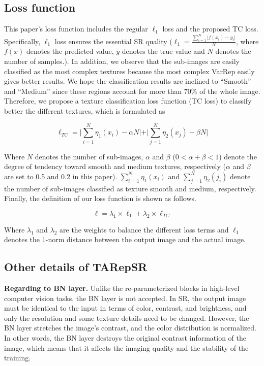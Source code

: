 \documentclass[sn-mathphys]{sn-jnl}%
\theoremstyle{thmstyleone}%
\theoremstyle{thmstyletwo}%
\theoremstyle{thmstylethree}%
\begin{document}
\subsection{Loss function}
This paper's loss function includes the regular $\ell_1$ loss and the proposed TC loss. Specifically, $\ell_1$ loss ensures the essential SR quality ($\ell_1=\frac{\sum_{i=1}^N \rvert f\left(x_i\right)-y_i \rvert}{N}$, where $f\left(x\right)$ denotes the predicted value, $y$ denotes the true value and $N$ denotes the number of samples.). In addition, we observe that the sub-images are easily classified as the most complex textures because the most complex VarRep easily gives better results. We hope the classification results are inclined to ``Smooth'' and ``Medium'' since these regions account for more than 70\% of the whole image. Therefore, we propose a texture classification loss function (TC loss) to classify better the different textures, which is formulated as

\begin{equation}
\ell_{T C}=\rvert \sum_{i=1}^N \eta_1\left(x_i\right)-\alpha N \rvert+\rvert \sum_{j=1}^N \eta_2\left(x_j\right)-\beta N \rvert
\end{equation} 

Where $N$ denotes the number of sub-images, $\alpha$ and $\beta$ ($0<\alpha+\beta<1$) denote the degree of tendency toward smooth and medium textures, respectively ($\alpha$ and $\beta$ are set to 0.5 and 0.2 in this paper).
$\sum_{i=1}^N \eta_1\left(x_i\right)$ and $\sum_{j=1}^N \eta_2\left(j_i\right)$ denote the number of sub-images classified as texture smooth and medium, respectively. Finally, the definition of our loss function is shown as follows.

\begin{equation}
\ell=\lambda_1 \times \ell_1+\lambda_2 \times \ell_{T C}
\end{equation}

Where $\lambda_1$ and $\lambda_2$ are the weights to balance the different loss terms and $\ell_1$ denotes the 1-norm distance between the output image and the actual image.

\subsection{Other details of TARepSR}
\textbf{Regarding to BN layer.} Unlike the re-parameterized blocks in high-level computer vision tasks, the BN layer \citep{BN} is not accepted. In SR, the output image must be identical to the input in terms of color, contrast, and brightness, and only the resolution and some texture details need to be changed. However, the BN layer stretches the image's contrast, and the color distribution is normalized. In other words, the BN layer destroys the original contrast information of the image, which means that it affects the imaging quality and the stability of the training.
\end{document}
